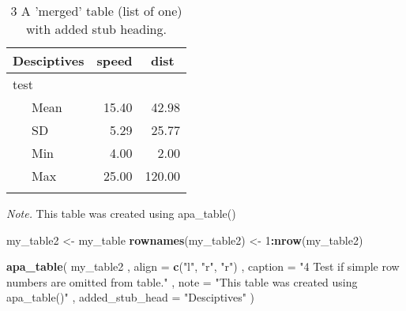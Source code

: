 \documentclass[english,man]{apa6}
\newenvironment{Shaded}{\begin{snugshade}}{\end{snugshade}}
\newcommand{\DataTypeTok}[1]{\textcolor[rgb]{0.13,0.29,0.53}{#1}}
\newcommand{\DecValTok}[1]{\textcolor[rgb]{0.00,0.00,0.81}{#1}}
\newcommand{\KeywordTok}[1]{\textcolor[rgb]{0.13,0.29,0.53}{\textbf{#1}}}
\newcommand{\NormalTok}[1]{#1}
\newcommand{\OperatorTok}[1]{\textcolor[rgb]{0.81,0.36,0.00}{\textbf{#1}}}
\newcommand{\StringTok}[1]{\textcolor[rgb]{0.31,0.60,0.02}{#1}}
\begin{document}
\begin{table}[tbp]

\begin{center}
\begin{threeparttable}

\caption{\label{tab:unnamed-chunk-7}3 A 'merged' table (list of one) with added stub heading.}

\begin{tabular}{lrr}
\toprule
Desciptives & \multicolumn{1}{c}{speed} & \multicolumn{1}{c}{dist}\\
\midrule
test &  & \\
\ \ \ Mean & 15.40 & 42.98\\
\ \ \ SD & 5.29 & 25.77\\
\ \ \ Min & 4.00 & 2.00\\
\ \ \ Max & 25.00 & 120.00\\
\bottomrule
\addlinespace
\end{tabular}

\begin{tablenotes}[para]
\normalsize{\textit{Note.} This table was created using apa\_table()}
\end{tablenotes}

\end{threeparttable}
\end{center}

\end{table}

\begin{Shaded}
\begin{Highlighting}[]
\NormalTok{my_table2 <-}\StringTok{ }\NormalTok{my_table}
\KeywordTok{rownames}\NormalTok{(my_table2) <-}\StringTok{ }\DecValTok{1}\OperatorTok{:}\KeywordTok{nrow}\NormalTok{(my_table2)}

\KeywordTok{apa_table}\NormalTok{(}
\NormalTok{  my_table2}
\NormalTok{  , }\DataTypeTok{align =} \KeywordTok{c}\NormalTok{(}\StringTok{"l"}\NormalTok{, }\StringTok{"r"}\NormalTok{, }\StringTok{"r"}\NormalTok{)}
\NormalTok{  , }\DataTypeTok{caption =} \StringTok{"4 Test if simple row numbers are omitted from table."}
\NormalTok{  , }\DataTypeTok{note =} \StringTok{"This table was created using apa_table()"}
\NormalTok{  , }\DataTypeTok{added_stub_head =} \StringTok{"Desciptives"}
\NormalTok{)}
\end{Highlighting}
\end{Shaded}
\end{document}
